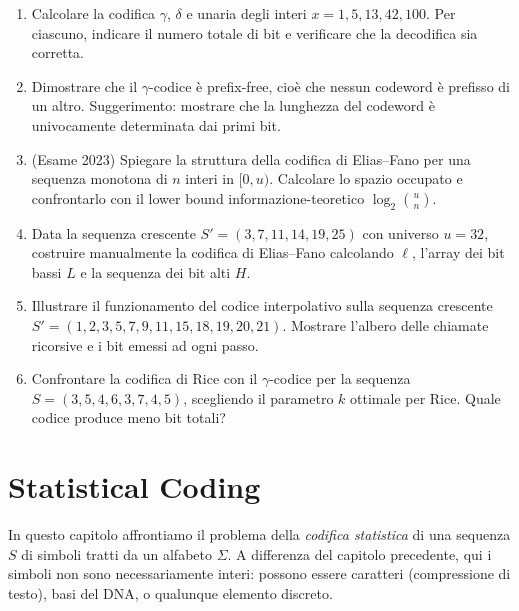 \documentclass[12pt, a4paper, oneside]{book}
\theoremstyle{plain}
\theoremstyle{definition}
\theoremstyle{remark}
\begin{document}
\begin{enumerate}
  \item Calcolare la codifica $\gamma$, $\delta$ e unaria degli interi $x = 1, 5, 13, 42, 100$. Per ciascuno, indicare il numero totale di bit e verificare che la decodifica sia corretta.

  \item Dimostrare che il $\gamma$-codice è prefix-free, cioè che nessun codeword è prefisso di un altro. Suggerimento: mostrare che la lunghezza del codeword è univocamente determinata dai primi bit.

  \item (Esame 2023) Spiegare la struttura della codifica di Elias--Fano per una sequenza monotona di $n$ interi in $[0, u)$. Calcolare lo spazio occupato e confrontarlo con il lower bound informazione-teoretico $\log_2 \binom{u}{n}$.

  \item Data la sequenza crescente $S' = (3, 7, 11, 14, 19, 25)$ con universo $u = 32$, costruire manualmente la codifica di Elias--Fano calcolando $\ell$, l'array dei bit bassi $L$ e la sequenza dei bit alti $H$.

  \item Illustrare il funzionamento del codice interpolativo sulla sequenza crescente $S' = (1, 2, 3, 5, 7, 9, 11, 15, 18, 19, 20, 21)$. Mostrare l'albero delle chiamate ricorsive e i bit emessi ad ogni passo.

  \item Confrontare la codifica di Rice con il $\gamma$-codice per la sequenza $S = (3, 5, 4, 6, 3, 7, 4, 5)$, scegliendo il parametro $k$ ottimale per Rice. Quale codice produce meno bit totali?
\end{enumerate}

\chapter{Statistical Coding}
\label{ch:statistical-coding}

In questo capitolo affrontiamo il problema della \emph{codifica statistica} di una sequenza $S$ di simboli tratti da un alfabeto $\Sigma$. A differenza del capitolo precedente, qui i simboli non sono necessariamente interi: possono essere caratteri (compressione di testo), basi del DNA, o qualunque elemento discreto.
\end{document}

